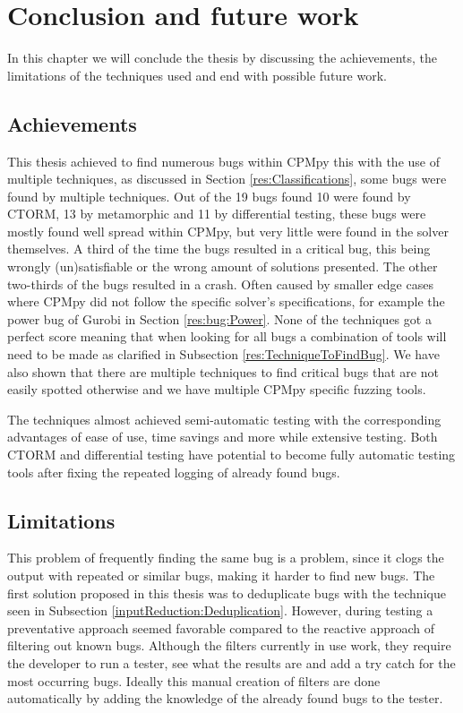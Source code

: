 \chapter{Conclusion and future work}
\label{cha:7:conclusion}
\label{con:intro}
In this chapter we will conclude the thesis by discussing the achievements, the limitations of the techniques used and end with possible future work.

\section{Achievements}
\label{con:Achievements}
This thesis achieved to find numerous bugs within CPMpy this with the use of multiple techniques, as discussed in Section \ref{res:Classifications}, some bugs were found by multiple techniques. Out of the 19 bugs found 10 were found by CTORM, 13 by metamorphic and 11 by differential testing, these bugs were mostly found well spread within CPMpy, but very little were found in the solver themselves. A third of the time the bugs resulted in a critical bug, this being wrongly (un)satisfiable or the wrong amount of solutions presented. The other two-thirds of the bugs resulted in a crash. Often caused by smaller edge cases where CPMpy did not follow the specific solver’s specifications, for example the power bug of Gurobi in Section \ref{res:bug:Power}. None of the techniques got a perfect score meaning that when looking for all bugs a combination of tools will need to be made as clarified in Subsection \ref{res:TechniqueToFindBug}. We have also shown that there are multiple techniques to find critical bugs that are not easily spotted otherwise and we have multiple CPMpy specific fuzzing tools.

The techniques almost achieved semi-automatic testing with the corresponding advantages of ease of use, time savings and more while extensive testing. Both CTORM and differential testing have potential to become fully automatic testing tools after fixing the repeated logging of already found bugs.


\section{Limitations}
\label{con:Limitations}
This problem of frequently finding the same bug is a problem, since it clogs the output with repeated or similar bugs, making it harder to find new bugs. The first solution proposed in this thesis was to deduplicate bugs with the technique seen in Subsection \ref{inputReduction:Deduplication}. However, during testing a preventative approach seemed  favorable compared to the reactive approach of filtering out known bugs. Although the filters currently in use work, they require the developer to run a tester, see what the results are and add a try catch for the most occurring bugs. Ideally this manual creation of filters are done automatically by adding the knowledge of the already found bugs to the tester. 

